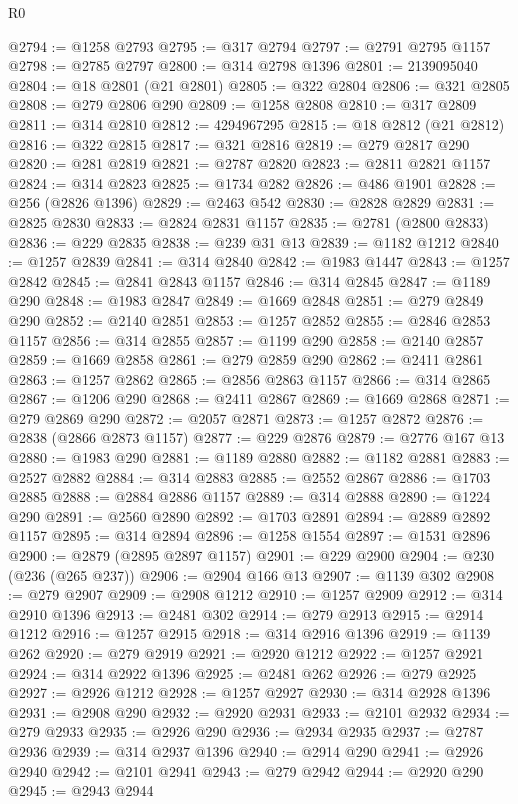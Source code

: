 \begin{lexlean}{R0}
\begin{coremodule}
@2794 := @1258 @2793
@2795 := @317 @2794
@2797 := @2791 @2795 @1157
@2798 := @2785 @2797
@2800 := @314 @2798 @1396
@2801 := 2139095040
@2804 := @18 @2801 (@21 @2801)
@2805 := @322 @2804
@2806 := @321 @2805
@2808 := @279 @2806 @290
@2809 := @1258 @2808
@2810 := @317 @2809
@2811 := @314 @2810
@2812 := 4294967295
@2815 := @18 @2812 (@21 @2812)
@2816 := @322 @2815
@2817 := @321 @2816
@2819 := @279 @2817 @290
@2820 := @281 @2819
@2821 := @2787 @2820
@2823 := @2811 @2821 @1157
@2824 := @314 @2823
@2825 := @1734 @282
@2826 := @486 @1901
@2828 := @256 (@2826 @1396)
@2829 := @2463 @542
@2830 := @2828 @2829
@2831 := @2825 @2830
@2833 := @2824 @2831 @1157
@2835 := @2781 (@2800 @2833)
@2836 := @229 @2835
@2838 := @239 @31 @13
@2839 := @1182 @1212
@2840 := @1257 @2839
@2841 := @314 @2840
@2842 := @1983 @1447
@2843 := @1257 @2842
@2845 := @2841 @2843 @1157
@2846 := @314 @2845
@2847 := @1189 @290
@2848 := @1983 @2847
@2849 := @1669 @2848
@2851 := @279 @2849 @290
@2852 := @2140 @2851
@2853 := @1257 @2852
@2855 := @2846 @2853 @1157
@2856 := @314 @2855
@2857 := @1199 @290
@2858 := @2140 @2857
@2859 := @1669 @2858
@2861 := @279 @2859 @290
@2862 := @2411 @2861
@2863 := @1257 @2862
@2865 := @2856 @2863 @1157
@2866 := @314 @2865
@2867 := @1206 @290
@2868 := @2411 @2867
@2869 := @1669 @2868
@2871 := @279 @2869 @290
@2872 := @2057 @2871
@2873 := @1257 @2872
@2876 := @2838 (@2866 @2873 @1157)
@2877 := @229 @2876
@2879 := @2776 @167 @13
@2880 := @1983 @290
@2881 := @1189 @2880
@2882 := @1182 @2881
@2883 := @2527 @2882
@2884 := @314 @2883
@2885 := @2552 @2867
@2886 := @1703 @2885
@2888 := @2884 @2886 @1157
@2889 := @314 @2888
@2890 := @1224 @290
@2891 := @2560 @2890
@2892 := @1703 @2891
@2894 := @2889 @2892 @1157
@2895 := @314 @2894
@2896 := @1258 @1554
@2897 := @1531 @2896
@2900 := @2879 (@2895 @2897 @1157)
@2901 := @229 @2900
@2904 := @230 (@236 (@265 @237))
@2906 := @2904 @166 @13
@2907 := @1139 @302
@2908 := @279 @2907
@2909 := @2908 @1212
@2910 := @1257 @2909
@2912 := @314 @2910 @1396
@2913 := @2481 @302
@2914 := @279 @2913
@2915 := @2914 @1212
@2916 := @1257 @2915
@2918 := @314 @2916 @1396
@2919 := @1139 @262
@2920 := @279 @2919
@2921 := @2920 @1212
@2922 := @1257 @2921
@2924 := @314 @2922 @1396
@2925 := @2481 @262
@2926 := @279 @2925
@2927 := @2926 @1212
@2928 := @1257 @2927
@2930 := @314 @2928 @1396
@2931 := @2908 @290
@2932 := @2920 @2931
@2933 := @2101 @2932
@2934 := @279 @2933
@2935 := @2926 @290
@2936 := @2934 @2935
@2937 := @2787 @2936
@2939 := @314 @2937 @1396
@2940 := @2914 @290
@2941 := @2926 @2940
@2942 := @2101 @2941
@2943 := @279 @2942
@2944 := @2920 @290
@2945 := @2943 @2944

\end{coremodule}
\end{lexlean}
